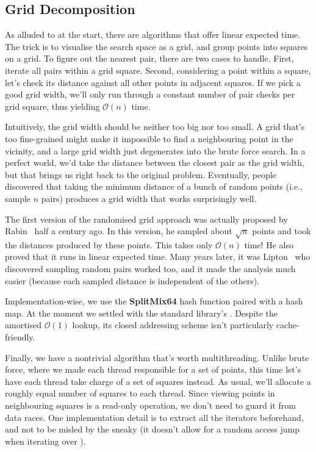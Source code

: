 \subsection{Grid Decomposition}

As alluded to at the start, there are algorithms that offer linear expected time. The trick is
to visualise the search space as a grid, and group points into squares on a grid. To figure
out the nearest pair, there are two cases to handle. First, iterate all pairs within
a grid square. Second, considering a point within a square, let's check its distance
against all other points in adjacent squares. If we pick a good grid width, we'll only
run through a constant number of pair checks per grid square, thus yielding $\mathcal{O}(n)$ time.

Intuitively, the grid width should be neither too big nor too small. A grid that's too fine-grained
might make it impossible to find a neighbouring point in the vicinity, and a large grid width
just degenerates into the brute force search. In a perfect world, we'd take the distance between
the closest pair as the grid width, but that brings us right back to the original problem. Eventually,
people discovered that taking the minimum distance of a bunch of random points (i.e., sample $n$ pairs)
produces a grid width that works surprisingly well.

The first version of the randomised grid approach was actually proposed by Rabin~\cite{rabin1976} half
a century ago. In this version, he sampled about $\sqrt{n}$ points
and took the distances produced by these points. This takes only $\mathcal{O}(n)$ time! He
also proved that it runs in linear expected time. Many years later, it was Lipton~\cite{lipton2010}
who discovered sampling random pairs worked too, and it made the analysis much easier (because each sampled distance
is independent of the others).

Implementation-wise, we use the \textbf{SplitMix64} hash function paired with a hash map. At
the moment we settled with the standard library's . Despite
the amortised $\mathcal{O}(1)$ lookup, its closed addressing scheme isn't particularly
cache-friendly.

\begin{aside}
    Finally, we have a nontrivial algorithm that's worth multithreading. Unlike brute force,
    where we made each thread responsible for a set of points, this time let's have each
    thread take charge of a set of squares instead. As usual, we'll allocate a roughly 
    equal number of squares to each thread. Since viewing points in neighbouring squares
    is a read-only operation, we don't need to guard it from data races. One implementation
    detail is to extract all the iterators beforehand, and not to be misled by
    the sneaky  (it doesn't allow for a random access jump when
    iterating over ).
\end{aside}


